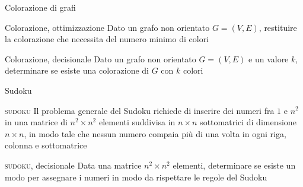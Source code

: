 \begin{frame}{Colorazione di grafi}

\vspace{-9pt}
\begin{block}{Colorazione, ottimizzazione}
Dato un grafo non orientato $G=(V,E)$, restituire la colorazione che necessita del numero minimo di colori
\end{block}

\begin{block}{Colorazione, decisionale}
Dato un grafo non orientato $G=(V,E)$ e un valore $k$, determinare se esiste
una colorazione di $G$ con $k$ colori
\end{block}

\end{frame}

\begin{frame}{Sudoku}

\vspace{-9pt}
\begin{block}{\textsc{sudoku}}
Il problema generale del \alert{Sudoku} richiede di inserire dei numeri
fra $1$ e $n^2$ in una matrice di $n^2 \times n^2$ elementi 
suddivisa in $n \times n$ sottomatrici di dimensione $n \times n$, 
in modo tale che nessun  numero compaia più di una volta in ogni 
riga, colonna e sottomatrice
\end{block}

\bigskip
\begin{block}{\textsc{sudoku}, decisionale}
Data una matrice $n^2 \times n^2$ elementi, determinare se esiste un modo per assegnare i numeri in modo da rispettare le regole del Sudoku
\end{block}

\end{frame}


